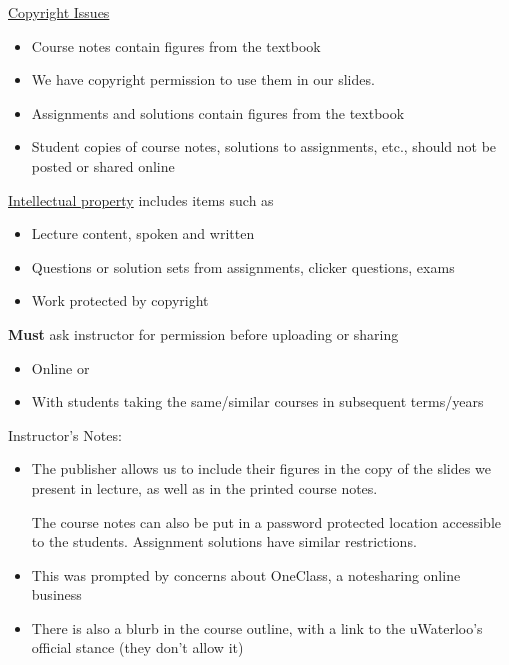 \begin{frame}[fragile]
\begin{multicols}{2}
\underline{Copyright Issues}
   \begin{itemize}
	\item Course notes contain figures from the textbook
	\item We have copyright permission to use them in our slides.

	\item Assignments and solutions contain figures from the textbook

	\item	Student copies of course notes, solutions to assignments, etc., 
		should not be posted or shared online
\end{itemize}

\columnbreak

\underline{Intellectual property} includes items such as
\begin{itemize}
\item Lecture content, spoken and written 
\item Questions or solution sets from assignments, clicker questions, exams
\item Work protected by copyright
\end{itemize}
\textbf{Must} ask instructor for permission before uploading or sharing 
\begin{itemize}
\item Online or
\item With students taking the same/similar courses in subsequent terms/years
\end{itemize}


\end{multicols}


\BNotes\ifnum{}
Instructor's Notes:
\begin{itemize}
       \item The publisher allows us to include their figures in the
		copy of the slides we present in lecture, as well as in
		the printed course notes.

		The course notes can also be put in a password protected
		location accessible to the students.  Assignment
		solutions have similar restrictions.
  \item This was prompted by concerns about OneClass, a notesharing online business
\item There is also a blurb in the course outline, with a link to the uWaterloo's official stance (they don't allow it)
\end{itemize}
\fi\ENotes
\end{frame}


